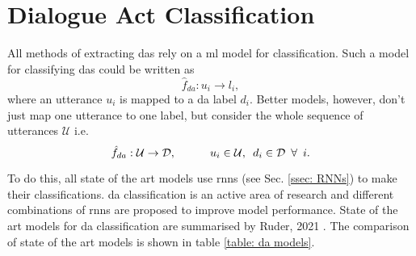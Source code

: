 
\section{Dialogue Act Classification \label{ssec: da classification}}
    All methods of extracting \glspl{da} rely on a \gls{ml} model for classification. Such a model for classifying \glspl{da} could be written as 
    \begin{equation}
        \hat{f}_{da}: u_i \rightarrow l_i,
    \end{equation}
    where an utterance $u_i$ is mapped to a \gls{da} label $d_i$. Better models, however, don't just map one \gls{utterance} to one label, but consider the whole sequence of \glspl{utterance} $\mathcal{U}$ i.e.
    \begin{equation}
        \hat{f}_{da}: \mathcal{U} \rightarrow \mathcal{D}, \hspace{3em} u_i \in \mathcal{U}, \hspace{0.5em} d_i \in \mathcal{D} \hspace{0.5em} \forall \hspace{0.5em} i.
    \end{equation}
    
    To do this, all state of the art models use \glspl{rnn} (see Sec. \ref{ssec: RNNs}) to make their classifications. \Gls{da} classification is an active area of research and different combinations of \glspl{rnn} are proposed to improve model performance. State of the art models for \gls{da} classification are summarised by Ruder, 2021 \cite{DAgithub}. The comparison of state of the art models is shown in table \ref{table: da models}.
    
